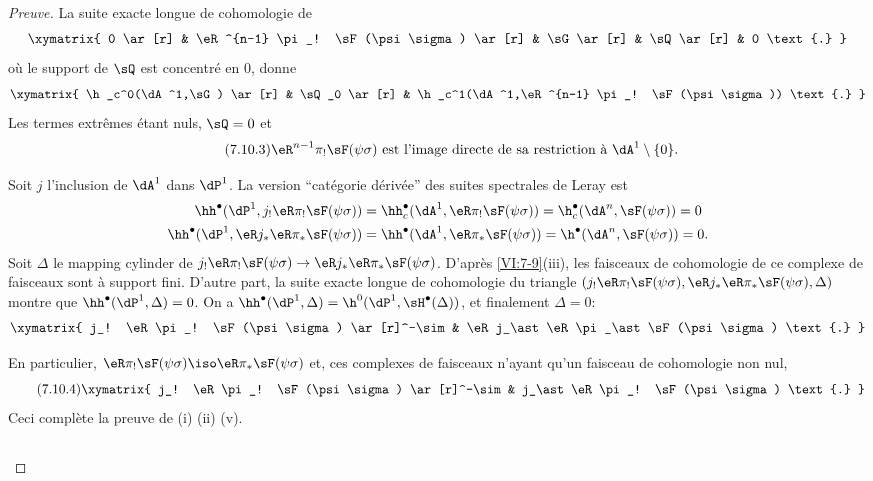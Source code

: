 \begin{proof}[Preuve]
La suite exacte longue de cohomologie de 
\[\xymatrix{
  0 \ar[r] 
    & \eR^{n-1} \pi_! \sF(\psi\sigma) \ar[r] 
    & \sG \ar[r] 
    & \sQ \ar[r] 
    & 0 \text{.} 
}\]
où le support de $\sQ$ est concentré en $0$, donne 
\[\xymatrix{
  \h_c^0(\dA^1,\sG) \ar[r] 
    & \sQ_0 \ar[r] 
    & \h_c^1(\dA^1,\eR^{n-1} \pi_! \sF(\psi\sigma)) \text{.} 
}\]
Les termes extrêmes étant nuls, $\sQ=0$ et 
\begin{equation*}\tag{7.10.3}\label{VI:eq:7-10-3}
  \text{$\eR^{n-1} \pi_! \sF(\psi\sigma)$ est l'image directe de sa restriction à $\dA^1\setminus \{0\}$.}
\end{equation*}

Soit $j$ l'inclusion de $\dA^1$ dans $\dP^1$. La version ``catégorie 
dérivée'' des suites spectrales de Leray est 
\begin{align*}
  \hh^\bullet(\dP^1,j_! \eR\pi_! \sF(\psi\sigma)) &= \hh_c^\bullet(\dA^1,\eR \pi_! \sF(\psi\sigma)) = \h_c^\bullet(\dA^n,\sF(\psi\sigma)) = 0 \\
  \hh^\bullet(\dP^1,\eR j_\ast \eR \pi_\ast \sF(\psi\sigma)) &= \hh^\bullet(\dA^1,\eR \pi_\ast \sF(\psi\sigma)) = \h^\bullet(\dA^n,\sF(\psi\sigma)) = 0 \text{.}
\end{align*}
Soit $\Delta$ le mapping cylinder de 
$j_! \eR\pi_! \sF(\psi\sigma) \to \eR j_\ast \eR \pi_\ast \sF(\psi\sigma)$. 
D'après \ref{VI:7-9}(iii), les faisceaux de cohomologie de ce complexe de 
faisceaux sont à support fini. D'autre part, la suite exacte longue de 
cohomologie du triangle 
$(j_!\eR \pi_! \sF(\psi\sigma),\eR j_\ast \eR \pi_\ast \sF(\psi\sigma),\Delta)$ 
montre que $\hh^\bullet(\dP^1,\Delta)=0$. On a 
$\hh^\bullet(\dP^1,\Delta) = \h^0(\dP^1,\sH^\bullet(\Delta))$, et finalement 
$\Delta=0$: 
\[\xymatrix{
  j_! \eR\pi_! \sF(\psi\sigma) \ar[r]^-\sim 
    & \eR j_\ast \eR \pi_\ast \sF(\psi\sigma) \text{.} 
}\]

En particulier, $\eR\pi_! \sF(\psi\sigma)\iso \eR\pi_\ast \sF(\psi\sigma)$ et, 
ces complexes de faisceaux n'ayant qu'un faisceau de cohomologie non nul, 
\begin{equation*}\tag{7.10.4}\label{VI:eq:7-10-4}
\xymatrix{
  j_! \eR \pi_! \sF(\psi\sigma) \ar[r]^-\sim 
    & j_\ast \eR \pi_! \sF(\psi\sigma) \text{.} 
}
\end{equation*}
Ceci complète la preuve de (i) (ii) (v). 






\subsection{}\label{VI:7-11}


\end{proof}
